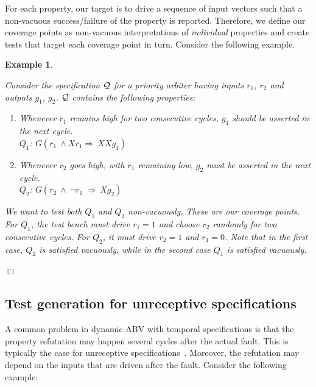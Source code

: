 \documentclass[a4paper, 11pt]{article}
\newtheorem{example}{Example} %
\begin{document}
\noindent
For each property, our target is to drive a sequence of input vectors
such that a non-vacuous success/failure of the property is reported.
Therefore, we
define our coverage points as non-vacuous interpretations of {\em individual}
properties and create tests that target each coverage point in turn.
Consider the following example.

\begin{example} \label{egvac}
{\em Consider the specification ${\cal Q}$ for a priority arbiter
having inputs $r_1$, $r_2$ and outputs $g_1$, $g_2$. ${\cal Q}$
contains the following properties:
\begin{enumerate} 

\item Whenever $r_1$ remains high for two consecutive cycles, $g_1$ should
    be asserted in the next cycle. \\
    $Q_1$: $G(r_1\  \land Xr_1 \Rightarrow\ XXg_1)$
\item Whenever $r_2$ goes high, with $r_1$ remaining low, $g_2$ must be
    asserted in the next cycle. \\
    $Q_2$: $G(r_2\  \land\ \neg r_1\ \Rightarrow\ Xg_2)$
\end{enumerate}
We want to test both $Q_1$ and $Q_2$ non-vacuously. These are
our coverage points. For $Q_1$, the test bench must drive
$r_1 = 1$ and choose $r_2$ randomly for two consecutive cycles.
For $Q_2$, it must drive $r_2 = 1$ and $r_1 = 0$. Note that in the
first case, $Q_2$ is satisfied vacuously, while in the second case
$Q_1$ is satisfied vacuously.
} $\Box$
\end{example}

\subsection{Test generation for unreceptive specifications} \label{sec4.2}
A common problem in dynamic ABV
with temporal specifications is that the property
refutation may happen several cycles after the actual fault. This is typically
the case for unreceptive specifications~\cite{dill}. Moreover,
the refutation may depend on the inputs that are driven after the
fault. Consider the following example:
\end{document}
